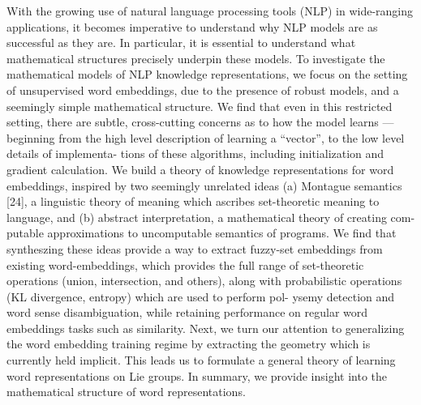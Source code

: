 \documentclass{article}
\begin{document}
With the growing use of natural language processing tools (NLP) in wide-ranging
applications, it becomes imperative to understand why NLP models are as
successful as they are.  In particular, it is essential to understand what
mathematical structures precisely underpin these models. To investigate the
mathematical models of NLP knowledge representations, we focus on the setting
of unsupervised word embeddings, due to the presence of robust models, and a
seemingly simple mathematical structure. We find that even in this restricted
setting, there are subtle, cross-cutting concerns as to how the model learns —
beginning from the high level description of learning a “vector”, to the low
level details of implementa- tions of these algorithms, including
initialization and gradient calculation. We build a theory of knowledge
representations for word embeddings, inspired by two seemingly unrelated ideas
(a) Montague semantics [24], a linguistic theory of meaning which ascribes
set-theoretic meaning to language, and (b) abstract interpretation, a
mathematical theory of creating com- putable approximations to uncomputable
semantics of programs. We find that syntheszing these ideas provide a way to
extract fuzzy-set embeddings from existing word-embeddings, which provides the
full range of set-theoretic operations (union, intersection, and others), along
with probabilistic operations (KL divergence, entropy) which are used to
perform pol- ysemy detection and word sense disambiguation, while retaining
performance on regular word embeddings tasks such as similarity. Next, we turn
our attention to generalizing the word embedding training regime by extracting
the geometry which is currently held implicit.  This leads us to formulate a
general theory of learning word representations on Lie groups.  In summary, we
provide insight into the mathematical structure of word representations.
\end{document}
